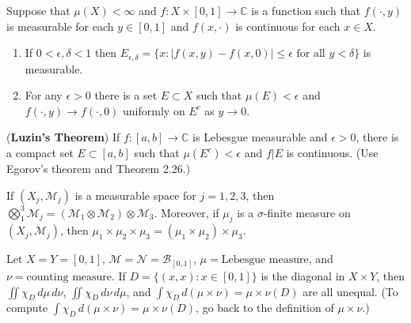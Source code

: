 	\begin{exercise}[Folland 2.43]
		Suppose that $\mu(X) < \infty$ and $f : X \times [0, 1] \to \mathbb{C}$ is a function such that $f(\cdot, y)$ is measurable for each $y \in [0, 1]$ and $f(x, \cdot)$ is continuous for each $x \in X$.
		\begin{enumerate}[label=\textbf{\alph*.}]
			\item If $0 < \epsilon, \delta < 1$ then $E_{\epsilon, \delta} = \{x : |f(x, y) - f(x, 0)| \le \epsilon \text{ for all } y < \delta\}$ is measurable.
			\item For any $\epsilon > 0$ there is a set $E \subset X$ such that $\mu(E) < \epsilon$ and $f(\cdot, y) \to f(\cdot, 0)$ uniformly on $E^c$ as $y \to 0$.
		\end{enumerate}
	\end{exercise}
	\begin{solution}

	\end{solution}

	\begin{exercise}[Folland 2.44]
		(\textbf{Luzin's Theorem}) If $f : [a, b] \to \mathbb{C}$ is Lebesgue measurable and $\epsilon > 0$, there is a compact set $E \subset [a, b]$ such that $\mu(E^c) < \epsilon$ and $f|E$ is continuous. (Use Egorov's theorem and Theorem 2.26.)
	\end{exercise}
	\begin{solution}

	\end{solution}

	\begin{exercise}[Folland 2.45]
		If $(X_j, \mathcal{M}_j)$ is a measurable space for $j = 1, 2, 3$, then $\bigotimes_1^3 \mathcal{M}_j = (\mathcal{M}_1 \otimes \mathcal{M}_2) \otimes \mathcal{M}_3$. Moreover, if $\mu_j$ is a $\sigma$-finite measure on $(X_j, \mathcal{M}_j)$, then $\mu_1 \times \mu_2 \times \mu_3 = (\mu_1 \times \mu_2) \times \mu_3$.
	\end{exercise}
	\begin{solution}

	\end{solution}

	\begin{exercise}[Folland 2.46]
		Let $X = Y = [0, 1]$, $\mathcal{M} = \mathcal{N} = \mathcal{B}_{[0, 1]}$, $\mu = \text{Lebesgue measure}$, and $\nu = \text{counting measure}$. If $D = \{(x, x) : x \in [0, 1]\}$ is the diagonal in $X \times Y$, then $\iint \chi_D \, d\mu \, d\nu$, $\iint \chi_D \, d\nu \, d\mu$, and $\int \chi_D \, d(\mu \times \nu) = \mu \times \nu(D)$ are all unequal. (To compute $\int \chi_D \, d(\mu \times \nu) = \mu \times \nu(D)$, go back to the definition of $\mu \times \nu$.)
	\end{exercise}
	\begin{solution}

	\end{solution}

